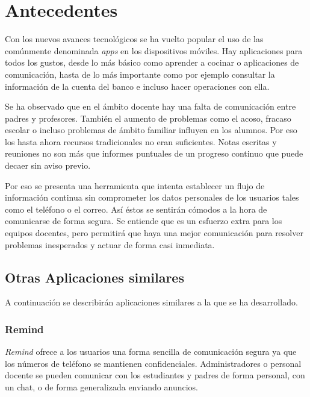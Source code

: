 %
%
%
%

\cleardoublepage
\chapter{Antecedentes}
\label{chap:record}

	Con los nuevos avances tecnológicos se ha vuelto popular el uso de las comúnmente denominada {\it apps} en los dispositivos móviles. Hay aplicaciones para todos los gustos, desde lo más básico como aprender a cocinar o aplicaciones de comunicación, hasta de lo más importante como por ejemplo consultar la información de la cuenta del banco e incluso hacer operaciones con ella.
	
	\bigskip
	Se ha observado que en el ámbito docente hay una falta de comunicación entre padres y profesores. También el aumento de problemas como el acoso, fracaso escolar o incluso problemas de ámbito familiar influyen en los alumnos. Por eso los hasta ahora recursos tradicionales no eran suficientes. Notas escritas y reuniones no son más que informes puntuales de un progreso continuo que puede decaer sin aviso previo.
	
	\bigskip
	Por eso se presenta una herramienta que intenta establecer un flujo de información continua sin comprometer los datos personales de los usuarios tales como el teléfono o el correo. Así éstos se sentirán cómodos a la hora de comunicarse de forma segura. Se entiende que es un esfuerzo extra para los equipos docentes, pero permitirá que haya una mejor comunicación para resolver problemas inesperados y actuar de forma casi inmediata.
	
	\section{Otras Aplicaciones similares}
	
	A continuación se describirán aplicaciones similares a la que se ha desarrollado.
	
	\subsection{Remind}
	{\it Remind}\cite{3:remind:online} ofrece a los usuarios una forma sencilla de comunicación segura ya que los números de teléfono se mantienen confidenciales. Administradores o personal docente se pueden comunicar con los estudiantes y padres de forma personal, con un chat, o de forma generalizada enviando anuncios.
	
